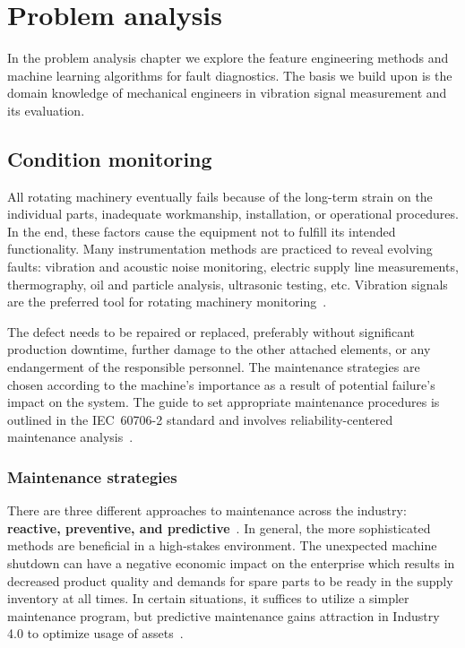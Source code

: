 \chapter{Problem analysis} \label{chapter:problem-analysis}
In the problem analysis chapter we explore the feature engineering methods and machine learning algorithms for fault diagnostics. The basis we build upon is the domain knowledge of mechanical engineers in vibration signal measurement and its evaluation.

\section{Condition monitoring} \label{section:condition-monitoring}
All rotating machinery eventually fails because of the long-term strain on the individual parts, inadequate workmanship, installation, or operational procedures. In the end, these factors cause the equipment not to fulfill its intended functionality. Many instrumentation methods are practiced to reveal evolving faults: vibration and acoustic noise monitoring, electric supply line measurements, thermography, oil and particle analysis, ultrasonic testing, etc. Vibration signals are the preferred tool for rotating machinery monitoring~\cite{mohanty_machinery_2015}.

The defect needs to be repaired or replaced, preferably without significant production downtime, further damage to the other attached elements, or any endangerment of the responsible personnel. The maintenance strategies are chosen according to the machine's importance as a result of potential failure's impact on the system. The guide to set appropriate maintenance procedures is outlined in the IEC~60706-2 standard and involves reliability-centered maintenance analysis~\cite{el-thalji_predictive_2019}.

\subsection{Maintenance strategies}
There are three different approaches to maintenance across the industry: \textbf{reactive, preventive, and predictive}~\cite{scheffer_practical_2004}. In general, the more sophisticated methods are beneficial in a high-stakes environment. The unexpected machine shutdown can have a negative economic impact on the enterprise which results in decreased product quality and demands for spare parts to be ready in the supply inventory at all times. In certain situations, it suffices to utilize a simpler maintenance program, but predictive maintenance gains attraction in Industry 4.0 to optimize usage of assets~\cite{cinar_machine_2020}.

